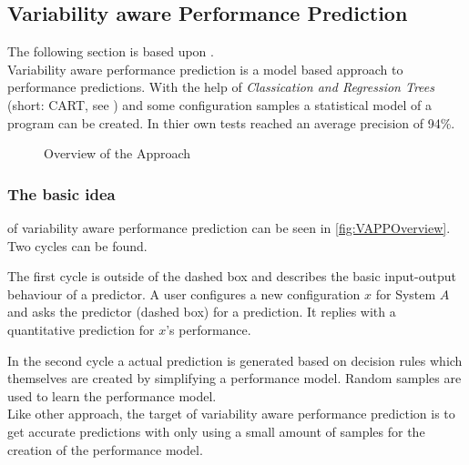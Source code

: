 \subsection{Variability aware Performance Prediction}

The following section is based upon \cite{VariabilityAwarePerformancePredictionJianmeiSigmundApel}.\\
Variability aware performance prediction is a model based approach to performance predictions. With the help of \textit{Classication and Regression Trees} (short: CART, see \cite{ClassificationandRegressionTrees}) and some configuration samples a statistical model of a program can be created. In thier own tests \citet{VariabilityAwarePerformancePredictionJianmeiSigmundApel} reached an average precision of 94\%.

\def\X{\ensuremath{\mathbf{X}}}
\def\Y{\ensuremath{\mathrm{Y}}}
\def\x{\ensuremath{\mathrm{\mathbf{x}}}}
\def\y{\ensuremath{\mathrm{y}}}

\begin{wrapfigure}{r}{.5\textwidth}
	\vspace{-1\baselineskip}
	\setlength\belowcaptionskip{-\baselineskip}
	
	\caption{Overview of the Approach \cite{VariabilityAwarePerformancePredictionJianmeiSigmundApel}}	
	\label{fig:VAPPOverview}
\end{wrapfigure}

\subsubsection[Basic Idea]{\textnormal{The} basic idea} of variability aware performance prediction can be seen in \autoref{fig:VAPPOverview}.
Two cycles can be found. 

The first cycle is outside of the dashed box and describes the basic input-output behaviour of a predictor. A user configures a new configuration $x$ for System $A$ and asks the predictor (dashed box) for a prediction. It replies with a quantitative prediction for $x$'s performance.

In the second cycle a actual prediction is generated based on decision rules which themselves are created by simplifying a performance model. Random samples are used to learn the performance model.\\
Like other approach, the target of variability aware performance prediction is to get accurate predictions with only using a small amount of samples for the creation of the performance model.

